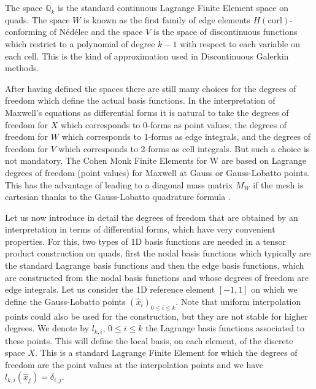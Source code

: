 The space $\mathbb{Q}_{k}$ is the standard continuous Lagrange Finite Element space on quads. 
The space $W$ is known as the first family of edge elements $H(\mathrm{curl})$-conforming of N\'ed\'elec \cite{nedelec1980} and the space $V$ is the space of discontinuous functions which restrict to a polynomial of degree $k-1$ with respect to each variable on each cell. This is the kind of approximation used in Discontinuous Galerkin methods.

After having defined the spaces there are still many choices for the degrees of freedom which define the actual basis functions. In the interpretation of Maxwell's equations as differential forms it is natural to take the degrees of freedom for $X$ which corresponds to 0-forms  as point values, the degrees of freedom for $W$ which corresponds to 1-forms  as edge integrals, and the degrees of freedom for $V$ which corresponds to 2-forms  as cell integrals.
But such a choice is not mandatory. The Cohen Monk Finite Elements for W are based on Lagrange degrees of freedom (point values) for Maxwell at Gauss or Gauss-Lobatto points. This has the advantage of leading to a diagonal mass matrix $M_W$ if the mesh is cartesian thanks to the Gauss-Lobatto quadrature formula \cite{cohen2001, cohen-monk}.

Let us now introduce in detail the degrees of freedom that are obtained by an interpretation in terms of differential forms, which have very convenient properties. For this, two types of 1D basis functions are needed in a tensor product construction on quads, first the nodal basis functions which typically are the standard Lagrange basis functions and then the edge basis functions, which are constructed from the nodal basis functions and whose degrees of freedom are edge integrals. Let us consider the 1D reference element $[-1,1]$ on which we define the Gauss-Lobatto points $(\hat{x}_i)_{0\leq i \leq k}$. Note that uniform interpolation points could also be used for the construction, but they are not stable for higher degrees. We denote by $l_{k,i}$, $0\leq i \leq k$ the Lagrange basis functions associated to these points. This will define the local basis, on each element, of the discrete space $X$. This is a standard Lagrange Finite Element for which the degrees of freedom are the point values at the interpolation points and we have   $l_{k,i}(\hat{x}_j)=\delta_{i,j}$.

